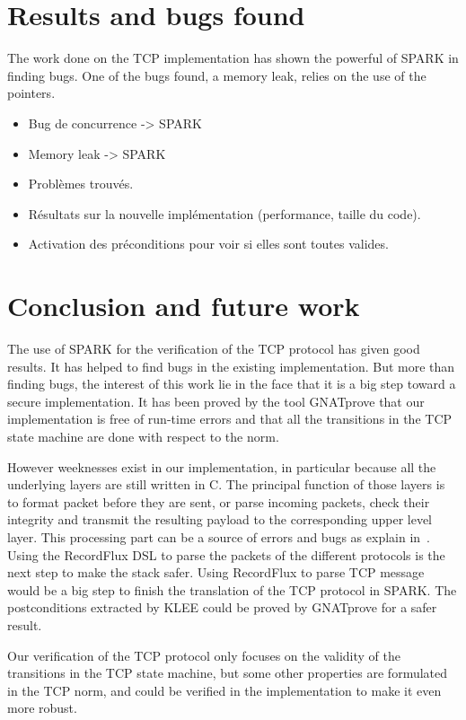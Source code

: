 \documentclass[runningheads]{llncs}
\begin{document}
\section{Results and bugs found}
\label{sec:results}

    The work done on the TCP implementation has shown the powerful
    of SPARK in finding bugs. One of the bugs found, a memory leak,
    relies on the use of the pointers.

    \begin{itemize}
        \item Bug de concurrence -> SPARK
        \item Memory leak -> SPARK
        \item Problèmes trouvés.
        \item Résultats sur la nouvelle implémentation (performance, taille du code).
        \item Activation des préconditions pour voir si elles sont toutes valides.
    \end{itemize}



\section{Conclusion and future work}

    The use of SPARK for the verification of the TCP protocol has given good results. It has helped to find bugs
    in the existing implementation. But more than finding bugs, the interest of this work lie in the face that it is
    a big step toward a secure implementation. It has been proved by the tool GNATprove that our implementation is free
    of run-time errors and that all the transitions in the TCP state machine are done with respect to the norm.

    However weeknesses exist in our implementation, in particular because all the underlying layers are still written in C.
    The principal function of those layers is to format packet before they are sent, or parse incoming packets, check
    their integrity and transmit the resulting payload to the corresponding upper level layer.
    This processing part can be a source of errors and bugs as explain in~\cite{Reiher2019RecordFluxFM}.
    Using the RecordFlux DSL to parse the packets of the different protocols is the next step to make the stack safer.
    Using RecordFlux to parse TCP message would be a big step to finish the translation of the TCP protocol in SPARK.
    The postconditions extracted by KLEE could be proved by GNATprove for a safer result.

    Our verification of the TCP protocol only focuses on the validity of the transitions in the TCP state machine,
    but some other properties are formulated in the TCP norm, and could be verified in the implementation to make
    it even more robust.






\end{document}
